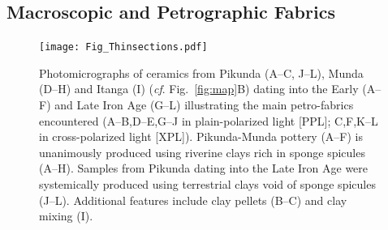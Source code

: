 \documentclass[smallextended,natbib]{svjour3}       %
\begin{document}
\subsection{Macroscopic and Petrographic Fabrics}

\begin{figure}[!tb]
	\texttt{[image: Fig\_Thinsections.pdf]}
	\caption{Photomicrographs of ceramics from Pikunda (A--C, J--L), Munda (D--H) and Itanga (I) (\textit{cf}. Fig.~\ref{fig:map}B) dating into the Early (A--F) and Late Iron Age (G--L) illustrating the main petro-fabrics encountered (A--B,D--E,G--J in plain-polarized light [PPL]; C,F,K--L in cross-polarized light [XPL]). Pikunda-Munda pottery (A--F) is unanimously produced using riverine clays rich in sponge spicules (A--H). Samples from Pikunda dating into the Late Iron Age were systemically produced using terrestrial clays void of sponge spicules (J--L). Additional features include clay pellets (B--C) and clay mixing (I).}
	\label{fig:thinsections}
\end{figure}
\end{document}
